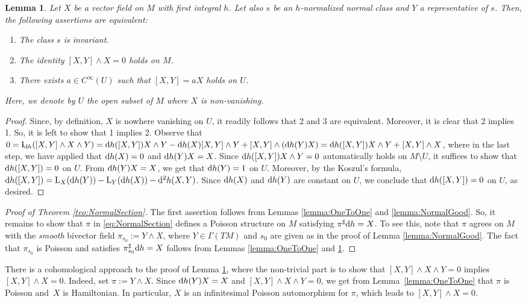 \documentclass[10pt,a4paper]{amsart}
\newcommand{\dd}{{\rm d}}
\newcommand{\ii}{\mathbf{i}}
\numberwithin{equation}{section}
\newtheorem{Lemma}[Theorem]{Lemma}
\begin{document}
\begin{Lemma}\label{lemma:NormalInv}
Let $X$ be a vector field on $M$ with first integral $h$. Let also $s$ be an $h$-normalized normal class and $Y$ a representative of $s$. Then, the following assertions are equivalent:
 \begin{enumerate}\itemsep=0pt
 \item[$1.$] The class $s$ is invariant.
 \item[$2.$] The identity $[X,Y]\wedge X = 0$ holds on $M$.
 \item[$3.$] There exists $a \in C^{\infty}(U)$ such that $[X,Y] = aX$ holds on $U$.
 \end{enumerate}
Here, we denote by $U$ the open subset of $M$ where $X$ is non-vanishing.
\end{Lemma}
\begin{proof}
Since, by definition, $X$ is nowhere vanishing on $U$, it readily follows that 2 and 3 are equivalent. Moreover, it is clear that 2 implies 1. So, it is left to show that 1 implies 2. Observe that $0 = \ii_{\dd h}([X,Y]\wedge X\wedge Y) = \dd h([X,Y]) X\wedge Y - \dd h(X)[X,Y]\wedge Y + [X,Y]\wedge(\dd h(Y)X) = \dd h([X,Y]) X\wedge Y + [X,Y]\wedge X$, where in the last step, we have applied that $\dd h(X) = 0$ and $\dd h(Y)X = X$. Since $\dd h([X,Y]) X \wedge Y = 0$ automatically holds on $M \setminus U$, it suffices to show that $\dd h([X,Y]) = 0$ on $U$. From $\dd h(Y)X = X$, we get that $\dd h(Y) = 1$ on $U$. Moreover, by the Koszul's formula, $\dd h([X,Y]) = {\rm L}_{X}(\dd h(Y)) - {\rm L}_{Y}(\dd h(X)) - \dd^2h(X,Y)$. Since $\dd h(X)$ and $\dd h(Y)$ are constant on $U$, we conclude that $\dd h([X,Y]) = 0$ on $U$, as desired.
\end{proof}


\begin{proof}[Proof of Theorem \ref{teo:NormalSection}]
The first assertion follows from Lemmas \ref{lemma:OneToOne} and \ref{lemma:NormalGood}. So, it remains to show that $\pi$ in \eqref{eq:NormalSection} defines a Poisson structure on $M$ satisfying $\pi^{\sharp}\dd h=X$. To see this, note that $\pi$ agrees on $M$ with the \emph{smooth} bivector field $\pi_{s_0}:=Y\wedge X$, where $Y\in\Gamma(TM)$ and $s_0$ are given as in the proof of Lemma \ref{lemma:NormalGood}. The fact that $\pi_{s_0}$ is Poisson and satisfies $\pi^{\sharp}_{s_0}\dd h=X$ follows from Lemmas \ref{lemma:OneToOne} and \ref{lemma:NormalInv}.
\end{proof}


\begin{Remark}
There is a cohomological approach to the proof of Lemma \ref{lemma:NormalInv}, where the non-trivial part is to show that $[X,Y] \wedge X \wedge Y = 0$ implies $[X,Y] \wedge X = 0$. Indeed, set $\pi := Y \wedge X$. Since $\dd h(Y)X = X$ and $[X,Y] \wedge X \wedge Y = 0$, we get from Lemma~\ref{lemma:OneToOne} that $\pi$ is Poisson and~$X$ is Hamiltonian. In particular, $X$ is an infinitesimal Poisson automorphism for $\pi$, which leads to $[X,Y] \wedge X = 0$.
\end{Remark}
\end{document}
